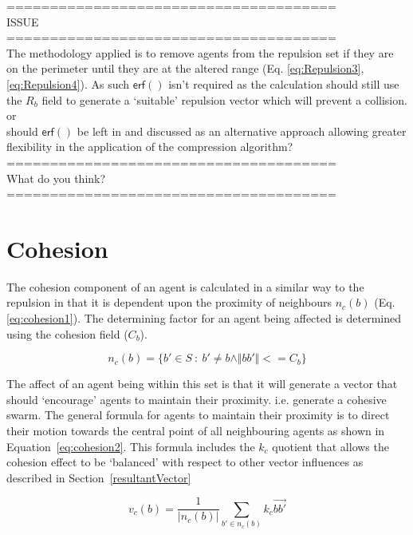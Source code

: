 \documentclass[12pt,a4paper]{article}
\newcommand{\magn}[1]{\Vert{#1}\Vert}
\begin{document}
\noindent======================================\\
ISSUE\\
======================================\\
The methodology applied is to remove agents from the repulsion set if they are on the perimeter until they are at the altered range (Eq. \ref{eq:Repulsion3},\ref{eq:Repulsion4}). As such $\mathsf{erf()}$ isn't required as the calculation should still use the $R_b$ field to generate a `suitable' repulsion vector which will prevent a collision.\\
or\\
should $\mathsf{erf()}$ be left in and discussed as an alternative approach allowing greater flexibility in the application of the compression algorithm?\\
======================================\\
What do you think?\\
======================================\\

\section{Cohesion}\label{cohesion}

The cohesion component of an agent is calculated in a similar way to the repulsion in that it is dependent upon the proximity of neighbours $n_c(b)$ (Eq. \ref{eq:cohesion1}). The determining factor for an agent being affected is determined using the cohesion field ($C_b$).

\begin{equation}\label{eq:cohesion1}
n_c(b) = \{b' \in S~:~b' \neq b \land\magn{bb'} <= C_b\}
\end{equation}

The affect of an agent being within this set is that it will generate a vector that should `encourage' agents to maintain their proximity. i.e. generate a cohesive swarm. The general formula for agents to maintain their proximity is to direct their motion towards the central point of all neighbouring agents as shown in Equation~\ref{eq:cohesion2}. This formula includes the $k_c$ quotient that allows the cohesion effect to be `balanced' with respect to other vector influences as described in Section~\ref{resultantVector} 

\begin{equation}\label{eq:cohesion2}
v_c(b) = \frac{1}{\lvert n_c(b)\rvert} \sum_{b' \in n_c(b)}k_c\vec{b b'}
\end{equation}
\end{document}
